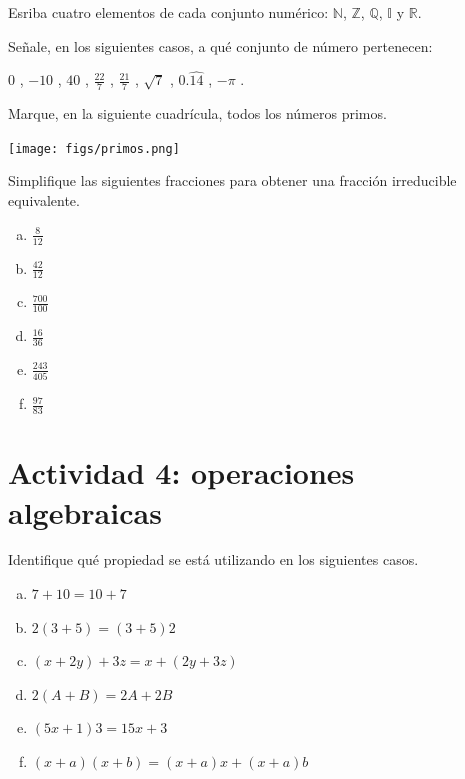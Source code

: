 \documentclass[11pt]{article}
\begin{document}
\begin{exercise}
Esriba cuatro elementos de cada conjunto numérico: $\mathbb{N}$, $\mathbb{Z}$, $\mathbb{Q}$, $\mathbb{I}$ y $\mathbb{R}$. 
\end{exercise}

\begin{exercise}
Señale, en los siguientes casos, a qué conjunto de número pertenecen:

$0$ \blank{}, $-10$ \blank{}, $40$ \blank{}, $\frac{22}{7}$ \blank{}, 
$\frac{21}{7}$ \blank{}, $\sqrt{7}$ \blank{}, $0.\widehat{14}$ \blank{}, 
$-\pi$ \blank{}.
\end{exercise}

\begin{exercise}
Marque, en la siguiente cuadrícula, todos los números primos.
\begin{center}
    \texttt{[image: figs/primos.png]}
\end{center}
\end{exercise}

\begin{exercise}
Simplifique las siguientes fracciones para obtener una fracción irreducible equivalente.
\begin{multicols}{6}
    \begin{enumerate}[a)]
    \item $\frac{8}{12}$
    \item $\frac{42}{12}$
    \item $\frac{700}{100}$
    \item $\frac{16}{36}$
    \item $\frac{243}{405}$
    \item $\frac{97}{83}$
\end{enumerate}
\end{multicols}
\end{exercise}

\section*{Actividad 4: operaciones algebraicas}

\begin{exercise}
Identifique qué propiedad se está utilizando en los siguientes casos.
\begin{multicols}{2}
    \begin{enumerate}[a)]
        \item $7 + 10 = 10 + 7$
        \item $2(3+5) = (3+5)2$
        \item $(x+2y) +3z = x +(2y+3z)$
        \item $2(A+B) = 2A + 2B$
        \item $(5x+1)3 = 15x + 3$
        \item $(x+a)(x+b) = (x+a)x+(x+a)b$
    \end{enumerate}
\end{multicols}
\end{exercise}
\end{document}
